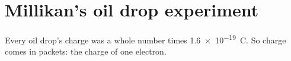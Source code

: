\section{Millikan's oil drop experiment}\label{ch2:sec:millikan}

\begin{bigidea}
Every oil drop's charge was a whole number times \qty{1.6e-19}{C}. So charge comes in packets:
the charge of one electron.
\end{bigidea}

\begin{keywords}
\end{keywords}

